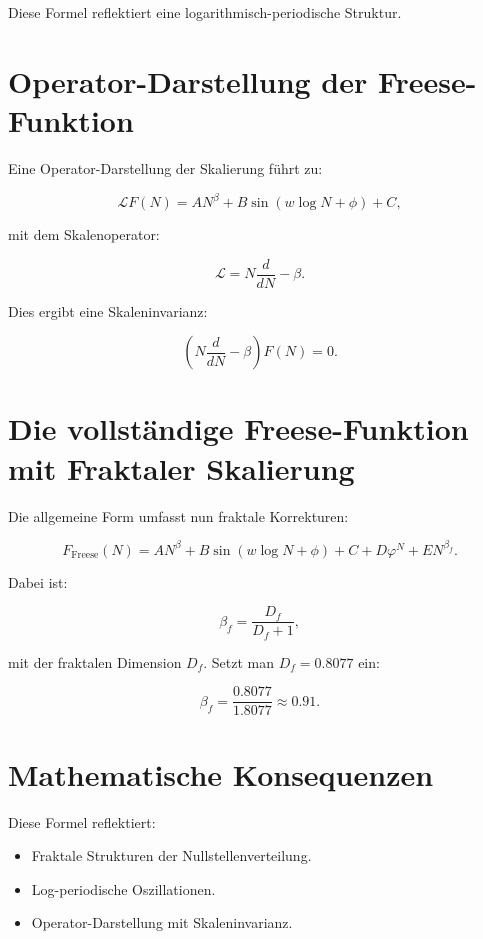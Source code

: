 \documentclass[a4paper,12pt]{article}
\begin{document}
Diese Formel reflektiert eine logarithmisch-periodische Struktur.

\section{Operator-Darstellung der Freese-Funktion}
Eine Operator-Darstellung der Skalierung führt zu:

\begin{equation}
\mathcal{L} F(N) = A N^\beta + B \sin(w \log N + \phi) + C,
\end{equation}

mit dem Skalenoperator:

\begin{equation}
\mathcal{L} = N \frac{d}{dN} - \beta.
\end{equation}

Dies ergibt eine Skaleninvarianz:

\begin{equation}
\left(N \frac{d}{dN} - \beta \right) F(N) = 0.
\end{equation}

\section{Die vollständige Freese-Funktion mit Fraktaler Skalierung}
Die allgemeine Form umfasst nun fraktale Korrekturen:

\begin{equation}
F_{\text{Freese}}(N) = A N^\beta + B \sin(w \log N + \phi) + C + D \varphi^N + E N^{\beta_f}.
\end{equation}

Dabei ist:

\begin{equation}
\beta_f = \frac{D_f}{D_f + 1},
\end{equation}

mit der fraktalen Dimension \( D_f \). Setzt man \( D_f = 0.8077 \) ein:

\begin{equation}
\beta_f = \frac{0.8077}{1.8077} \approx 0.91.
\end{equation}

\section{Mathematische Konsequenzen}
Diese Formel reflektiert:
\begin{itemize}
    \item Fraktale Strukturen der Nullstellenverteilung.
    \item Log-periodische Oszillationen.
    \item Operator-Darstellung mit Skaleninvarianz.
\end{itemize}
\end{document}
